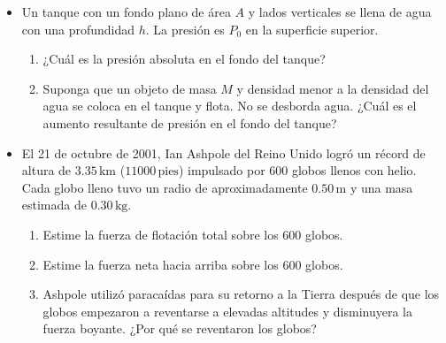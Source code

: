 \documentclass[11pt,a4paper]{article}
\begin{document}
\begin{itemize}
    \item[\textbf{3.}] Un tanque con un fondo plano de área \(A\) y lados verticales se llena de agua con una profundidad \(h\). La presión es \(P_0\) en la superficie superior.
    \begin{enumerate}
        \item[\textbf{(a)}] ¿Cuál es la presión absoluta en el fondo del tanque?
        \item[\textbf{(b)}] Suponga que un objeto de masa \(M\) y densidad menor a la densidad del agua se coloca en el tanque y flota. No se desborda agua. ¿Cuál es el aumento resultante de presión en el fondo del tanque?
    \end{enumerate}
    \vspace*{7cm}
    
    \item[\textbf{4.}] El 21 de octubre de 2001, Ian Ashpole del Reino Unido logró un récord de altura de \(3.35\,\text{km}\) (\(11000\,\text{pies}\)) impulsado por 600 globos llenos con helio. Cada globo lleno tuvo un radio de aproximadamente \(0.50\,\text{m}\) y una masa estimada de \(0.30\,\text{kg}\).
    \begin{enumerate}
        \item[\textbf{(a)}] Estime la fuerza de flotación total sobre los 600 globos.
        \item[\textbf{(b)}] Estime la fuerza neta hacia arriba sobre los 600 globos.
        \item[\textbf{(c)}] Ashpole utilizó paracaídas para su retorno a la Tierra después de que los globos empezaron a reventarse a elevadas altitudes y disminuyera la fuerza boyante. ¿Por qué se reventaron los globos?
    \end{enumerate}
    \vspace*{7cm}
\end{itemize}

\newpage
\end{document}
